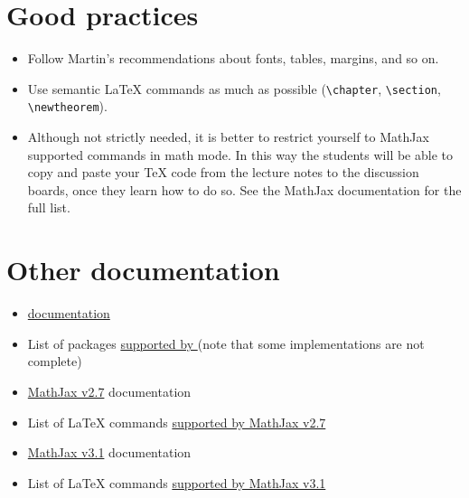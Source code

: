 \documentclass[a4paper]{article}
\def\ltxinline{\lstinline[style=latexml,frame=none]}
\theoremstyle{definition}
\begin{document}
\section{Good practices}
\begin{itemize}
  \item Follow Martin's recommendations about fonts, tables, margins, and so on.
  \item Use semantic \LaTeX{} commands as much as possible (\ltxinline|\chapter|, \ltxinline|\section|, \ltxinline|\newtheorem|).
  \item Although not strictly needed, it is better to restrict yourself to MathJax supported commands in math mode. In this way the students will be able to copy and paste your \TeX{} code from the lecture notes to the discussion boards, once they learn how to do so. See the MathJax documentation for the full list.
\end{itemize}

\section{Other documentation}
\begin{itemize}
  \item \href{https://dlmf.nist.gov/LaTeXML/docs.html}{\LaTeXML{} documentation}
  \item List of packages \href{https://dlmf.nist.gov/LaTeXML/manual/included.bindings/}{supported by \LaTeXML{}} (note that some implementations are not complete)
  \item \href{http://docs.mathjax.org/en/v2.7-latest/}{MathJax v2.7} documentation
  \item List of \LaTeX{} commands \href{http://docs.mathjax.org/en/v2.7-latest/tex.html#supported-latex-commands}{supported by MathJax v2.7}
  \item \href{http://docs.mathjax.org/en/v3.1-latest/}{MathJax v3.1} documentation
  \item List of \LaTeX{} commands \href{http://docs.mathjax.org/en/v3.1-latest/input/tex/macros/index.html}{supported by MathJax v3.1}
\end{itemize}
\end{document}
